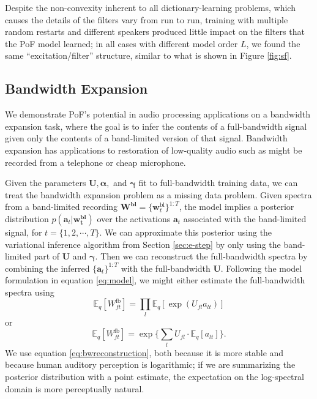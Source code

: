 \documentclass{article} %
\begin{document}
Despite the non-convexity inherent to all dictionary-learning problems, which causes the details of the filters vary from run to run, training with multiple random restarts and different speakers produced little impact on the filters that the PoF model learned; in all cases with different model order $L$, we found the same ``excitation/filter'' structure, similar to what is shown in Figure \ref{fig:sf}.


\subsection{Bandwidth Expansion}

We demonstrate PoF's potential in audio processing applications on a
bandwidth expansion task, where the goal is to infer the contents of a
full-bandwidth signal given only the contents of a band-limited
version of that signal. Bandwidth expansion has applications to
restoration of low-quality audio such as might be recorded from a
telephone or cheap microphone.

Given the parameters $\mathbf{U}, \bm{\alpha},$ and $\bm{\gamma}$ fit
to full-bandwidth training data, we can treat the bandwidth expansion
problem as a missing data problem. Given spectra from a band-limited
recording $\mathbf{W^{\text{bl}}} = \{\bm{w}^{\text{bl}}_t\}^{1:T}$,
the model implies a posterior distribution
$p(\bm{a}_t|\bm{w^{\text{bl}}_t})$ over the activations $\bm{a}_t$
associated with the band-limited signal, for $t = \{1, 2, \cdots, T\}$. 
We can approximate this posterior
using the variational inference algorithm from Section \ref{sec:e-step} by only using the band-limited part of
$\mathbf{U}$ and $\bm{\gamma}$. Then we can reconstruct the full-bandwidth spectra
by combining the inferred $\{\bm{a}_t\}^{1:T}$ with the full-bandwidth
$\mathbf{U}$. Following the model formulation in equation
\ref{eq:model}, we might either estimate the full-bandwidth spectra
using
\begin{equation}
\mathbb{E}_q [W^{\text{fb}}_{ft}] = \textstyle{\prod_l} \mathbb{E}_q [\exp(U_{fl} a_{lt})]
\end{equation}
or
\begin{equation}
\label{eq:bwreconstruction}
\mathbb{E}_q [W^{\text{fb}}_{ft}] = \exp \{\textstyle{\sum_l} U_{fl} \cdot \mathbb{E}_q [a_{lt}]\}.
\end{equation}
We use equation \ref{eq:bwreconstruction}, both because it is more
stable and because human auditory perception is logarithmic; if we are
summarizing the posterior distribution with a point estimate, the
expectation on the log-spectral domain is more perceptually natural.
\end{document}
